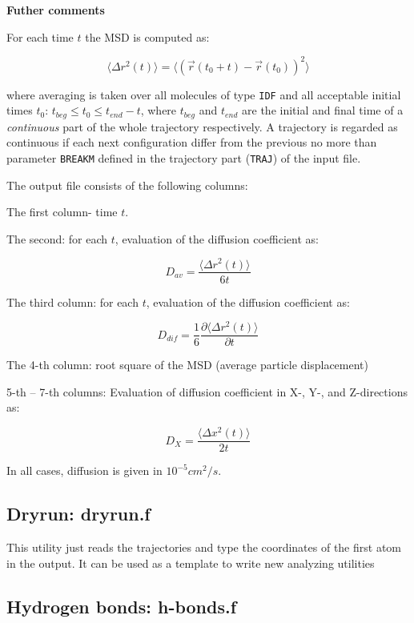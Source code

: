 \documentclass{article}
\begin{document}
{\bf Futher comments}

For each time $t$ the MSD is computed as:

\begin{equation}
\label{diffusion}
\langle \Delta r^2(t)\rangle = \langle (\vec{r}(t_0+t)-\vec{r}(t_0))^2\rangle
\end{equation}

where averaging is taken over all molecules of type \verb|IDF| and all
acceptable initial times $t_0$:   $t_{beg} \le t_0 \le t_{end}-t$, where
$t_{beg}$ and $t_{end}$ are the initial and final time of a {\it continuous}
part of the whole trajectory respectively. A trajectory is regarded as 
continuous if each next configuration differ from the previous no more
than parameter \verb|BREAKM| defined in the trajectory part (\verb|TRAJ|)
of the input file.

The output file consists of the following columns:

The first column- time $t$.

The second: for each $t$, evaluation of the diffusion coefficient as:

$$D_{av} = \frac{\langle \Delta r^2(t)\rangle}{6t}$$

The third column: for each $t$, evaluation of the diffusion coefficient as:

$$D_{dif} = \frac{1}{6}\frac{\partial\langle \Delta r^2(t)\rangle}{\partial t}$$

The 4-th column: root square of the MSD (average particle displacement)

5-th -- 7-th columns: Evaluation of diffusion coefficient in X-, Y-, and 
Z-directions as:  
  
$$D_{X} = \frac{\langle \Delta x^2(t)\rangle}{2t}$$

In all cases, diffusion is given in $10^{-5}cm^2/s$.

\subsection{Dryrun: dryrun.f}

This utility just reads the trajectories and type the coordinates of the first 
atom in the output. It can be used as a template to write new analyzing 
utilities

\subsection{Hydrogen bonds: h-bonds.f}
\end{document}

